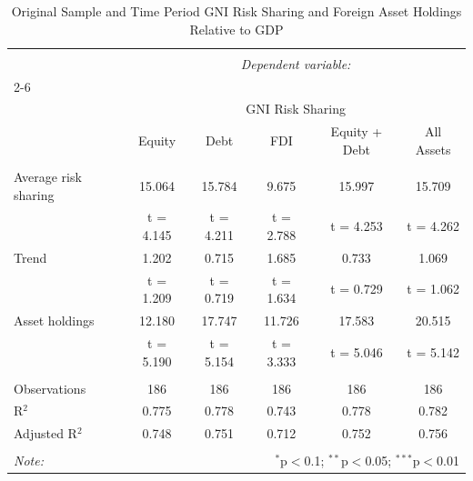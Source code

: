 
\begin{table}[!htbp] \centering 
  \caption{Original Sample and Time Period GNI Risk Sharing and Foreign Asset Holdings Relative to GDP} 
  \label{} 
\begin{tabular}{@{\extracolsep{5pt}}lccccc} 
\\[-1.8ex]\hline 
\hline \\[-1.8ex] 
 & \multicolumn{5}{c}{\textit{Dependent variable:}} \\ 
\cline{2-6} 
\\[-1.8ex] & \multicolumn{5}{c}{GNI Risk Sharing} \\ 
 & Equity & Debt & FDI & Equity + Debt & All Assets \\ 
\hline \\[-1.8ex] 
 Average risk sharing & 15.064 & 15.784 & 9.675 & 15.997 & 15.709 \\ 
  & t = 4.145 & t = 4.211 & t = 2.788 & t = 4.253 & t = 4.262 \\ 
  Trend & 1.202 & 0.715 & 1.685 & 0.733 & 1.069 \\ 
  & t = 1.209 & t = 0.719 & t = 1.634 & t = 0.729 & t = 1.062 \\ 
  Asset holdings & 12.180 & 17.747 & 11.726 & 17.583 & 20.515 \\ 
  & t = 5.190 & t = 5.154 & t = 3.333 & t = 5.046 & t = 5.142 \\ 
 \hline \\[-1.8ex] 
Observations & 186 & 186 & 186 & 186 & 186 \\ 
R$^{2}$ & 0.775 & 0.778 & 0.743 & 0.778 & 0.782 \\ 
Adjusted R$^{2}$ & 0.748 & 0.751 & 0.712 & 0.752 & 0.756 \\ 
\hline 
\hline \\[-1.8ex] 
\textit{Note:}  & \multicolumn{5}{r}{$^{*}$p$<$0.1; $^{**}$p$<$0.05; $^{***}$p$<$0.01} \\ 
\end{tabular} 
\end{table} 
